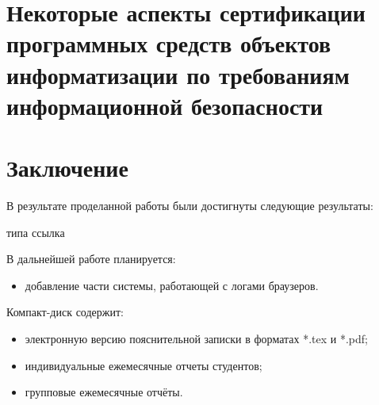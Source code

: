 \documentclass[russian,utf8,14pt,simple]{eskdtext}
\begin{document}


\section{Некоторые аспекты сертификации программных средств объектов\\ информатизации по требованиям информационной безопасности}



\newpage
\section{Заключение}
В результате проделанной работы были достигнуты следующие результаты:


типа ссылка \cite{qtdoc}

В дальнейшей работе планируется:
\begin{itemize}
\item добавление части системы, работающей с логами браузеров.
\end{itemize}

\newpage
\renewcommand{\refname}{Список использованных источников}


Компакт-диск содержит: 
\begin{itemize}
\item электронную версию пояснительной записки в форматах *.tex и *.pdf;
\item индивидуальные ежемесячные отчеты студентов;
\item групповые ежемесячные отчёты.
\end{itemize}
\end{document}
